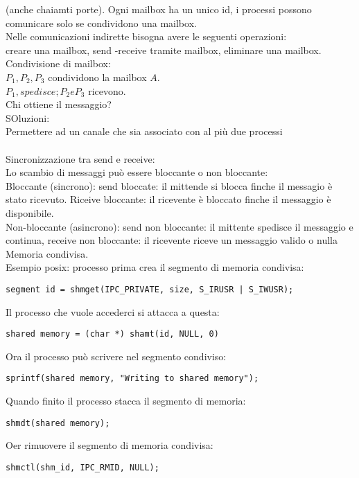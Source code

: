 \documentclass{article}
\begin{document}
(anche chaiamti porte). Ogni mailbox ha un unico id, i processi possono comunicare solo se condividono una mailbox.\\
Nelle comunicazioni indirette bisogna avere le seguenti operazioni:\\
creare una mailbox, send -receive tramite mailbox, eliminare una mailbox.\\
Condivisione di mailbox:\\
$P_1, P_2, P_3$ condividono la mailbox $A$.\\
$P_1, spedisce; P_2 e P_3$ ricevono.\\
Chi ottiene il messaggio?\\
SOluzioni:\\
Permettere ad un canale che sia associato con al pi\`{u} due processi\\
\\
Sincronizzazione tra send e receive:\\
Lo scambio di messaggi pu\`{o} essere bloccante o non bloccante:\\
Bloccante (sincrono): send bloccate: il mittende si blocca finche il messagio \`{e} stato ricevuto. Riceive bloccante: il ricevente \`{e} bloccato finche il messaggio \`{e} disponibile.\\
Non-bloccante (asincrono): send non bloccante: il mittente spedisce il messaggio e continua, receive non bloccante: il ricevente riceve un messaggio valido o nulla
\\
Memoria condivisa.\\
Esempio posix: processo prima crea il segmento di memoria condivisa:
\begin{verbatim}
segment id = shmget(IPC_PRIVATE, size, S_IRUSR | S_IWUSR);	
\end{verbatim}
Il processo che vuole accederci si attacca a questa:
\begin{verbatim}
shared memory = (char *) shamt(id, NULL, 0)
\end{verbatim}
Ora il processo pu\`{o} scrivere nel segmento condiviso:
\begin{verbatim}
sprintf(shared memory, "Writing to shared memory");
\end{verbatim}
Quando finito il processo stacca il segmento di memoria:
\begin{verbatim}
shmdt(shared memory);
\end{verbatim}
Oer rimuovere il segmento di memoria condivisa:
\begin{verbatim}
shmctl(shm_id, IPC_RMID, NULL);
\end{verbatim}
\end{document}
